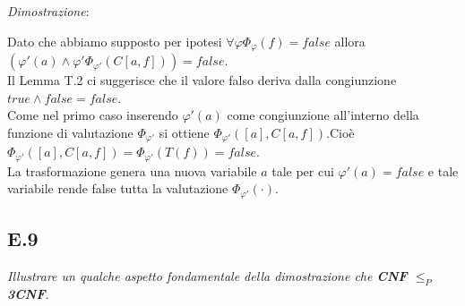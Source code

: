 \documentclass[a4paper]{article}
\newenvironment{dimostrazione}{\textit{Dimostrazione}:\begin{adjustwidth}{1cm}{}}{\end{adjustwidth}}
\begin{document}
\begin{dimostrazione}
\begin{itemize}
			Dato che abbiamo supposto per ipotesi $\forall \varphi \Phi_\varphi(f) = false$ allora $(\varphi'(a) \land \varphi' \Phi_{\varphi'}(C[a,f]))=false$.\\
			Il Lemma T.2 ci suggerisce che il valore falso deriva dalla congiunzione $true \land false = false$.\\
			Come nel primo caso inserendo $\varphi'(a)$ come congiunzione all'interno della funzione di valutazione $\Phi_{\varphi'}$ si ottiene $\Phi_{\varphi'}([a],C[a,f])$.Cioè $\Phi_{\varphi'}([a],C[a,f]) = \Phi_{\varphi'}(T(f))=false$.\\
			La trasformazione genera una nuova variabile $a$ tale per cui $\varphi'(a) = false$ e tale variabile rende false tutta la valutazione $\Phi_{\varphi'}(\cdot)$.
	\end{itemize}
\end{dimostrazione}
\subsection{E.9}
\emph{Illustrare un qualche aspetto fondamentale della dimostrazione che \textbf{CNF} $\leq_P$ \textbf{3CNF}.}
\end{document}
